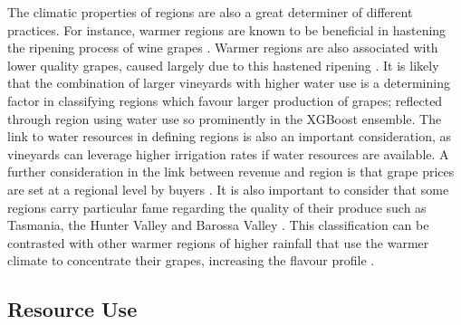 \documentclass[review,12pt,authoryear]{elsarticle}
\begin{document}
\begin{linenumbers}
\par
The climatic properties of regions are also a great determiner of different practices. For instance, warmer regions are known to be beneficial in hastening the ripening process of wine grapes \citep{webbObservedTrendsWinegrape2011}. Warmer regions are also associated with lower quality grapes, caused largely due to this hastened ripening \citep{bottingCanopyArchitectureImplicationsShiraz1996}. It is likely that the combination of larger vineyards with higher water use is a determining factor in classifying regions which favour larger production of grapes; reflected through region using water use so prominently in the XGBoost ensemble. The link to water resources in defining regions is also an important consideration, as vineyards can leverage higher irrigation rates if water resources are available. A further consideration in the link between revenue and region is that grape prices are set at a regional level by buyers \citep{wineaustraliaNationalVintageReport2022}. It is also important to consider that some regions carry particular fame regarding the quality of their produce such as Tasmania, the Hunter Valley and Barossa Valley \citep{hallidayAustralianWineEncyclopedia2009}. This classification can be contrasted with other warmer regions of higher rainfall that use the warmer climate to concentrate their grapes, increasing the flavour profile \citep{goodwinijeriepRegulatedDeficitIrrigation1992,mgmccarthyEffectCropLoad1986}.

\subsection{Resource Use}


\end{linenumbers}
\end{document}
